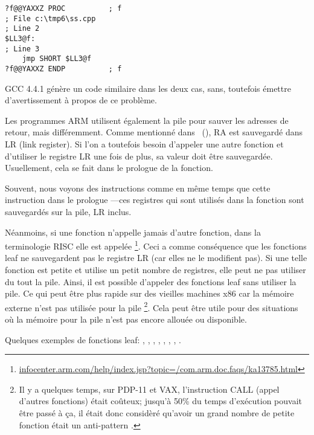 \begin{lstlisting}[style=customasmx86]
?f@@YAXXZ PROC			; f
; File c:\tmp6\ss.cpp
; Line 2
$LL3@f:
; Line 3
	jmp	SHORT $LL3@f
?f@@YAXXZ ENDP			; f
\end{lstlisting}

GCC 4.4.1 génère un code similaire dans les deux cas, sans, toutefois émettre
d'avertissement à propos de ce problème.


Les programmes ARM utilisent également la pile pour sauver les adresses de retour,
mais différemment.
Comme mentionné dans \q{\HelloWorldSectionName}~(),
\ac{RA} est sauvegardé dans \ac{LR} (\gls{link register}).
Si l'on a toutefois besoin d'appeler une autre fonction et d'utiliser le registre
\ac{LR} une fois de plus, sa valeur doit être sauvegardée.
Usuellement, cela se fait dans le prologue de la fonction.

Souvent, nous voyons des instructions comme  en même temps
que cette instruction dans le prologue ---ces registres qui
sont utilisés dans la fonction sont sauvegardés sur la pile, \ac{LR} inclus.

Néanmoins, si une fonction n'appelle jamais d'autre fonction, dans la terminologie
\ac{RISC} elle est appelée \footnote{\href{http://go.yurichev.com/17064}{infocenter.arm.com/help/index.jsp?topic=/com.arm.doc.faqs/ka13785.html}}.
Ceci a comme conséquence que les fonctions leaf ne sauvegardent pas le registre
\ac{LR} (car elles ne le modifient pas).
Si une telle fonction est petite et utilise un petit nombre de registres, elle
peut ne pas utiliser du tout la pile.
Ainsi, il est possible d'appeler des fonctions leaf sans utiliser la pile.
Ce qui peut être plus rapide sur des vieilles machines x86 car la mémoire externe
n'est pas utilisée pour la pile
\footnote{Il y a quelques temps, sur PDP-11 et VAX, l'instruction CALL (appel d'autres fonctions) était coûteux; jusqu'à 50\%
du temps d'exécution pouvait être passé à ça, il était donc considèré qu'avoir un grand nombre de petite fonction était un \gls{anti-pattern} .}.
Cela peut être utile pour des situations où la mémoire pour la pile n'est pas
encore allouée ou disponible.

Quelques exemples de fonctions leaf:
, ,
, , ,
, , .

